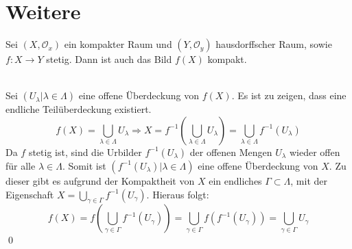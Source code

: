 \section{Weitere}
% 
\begin{Satz}\label{satz:ftk:kompakt}
	Sei \( (X, \mathcal{O}_x) \) ein kompakter Raum und \((Y, \mathcal{O}_y)\) hausdorffscher Raum, sowie \\
	\(f: X \to Y\) stetig.
	Dann ist auch das Bild \( f(X) \) kompakt.
\end{Satz}
%
	\\
	Sei \( (U_{\lambda} | \lambda \in \Lambda) \) eine offene Überdeckung von \(f(X)\). Es ist zu zeigen,
	dass eine endliche Teilüberdeckung existiert. 
	\[ f(X) = \bigcup_{\lambda \in \Lambda} U_{\lambda} \Rightarrow X = 
  	 f^{-1}(\bigcup_{\lambda \in \Lambda} U_{\lambda}) = 
		 \bigcup_{\lambda \in \Lambda} f^{-1}(U_{\lambda}) \]
	Da \(f\) stetig ist, sind die Urbilder \( f^{-1}(U_{\lambda}) \) der offenen Mengen \(U_{\lambda}\) wieder offen für 
	alle \(\lambda \in \Lambda\). Somit ist \( ( f^{-1}(U_{\lambda}) | \lambda \in \Lambda ) \) eine offene Überdeckung
	von \(X\). Zu dieser gibt es aufgrund der Kompaktheit von \(X\) ein endliches \( \Gamma \subset \Lambda \), mit 
	der Eigenschaft \( X = \bigcup_{\gamma \in \Gamma} f^{-1}(U_{\gamma}) \). Hieraus folgt:
	\[ f(X) = f(\bigcup_{\gamma \in \Gamma} f^{-1}(U_{\gamma})) = 
  	 \bigcup_{\gamma \in \Gamma} f(f^{-1}(U_{\gamma})) = 
	   \bigcup_{\gamma \in \Gamma} U_{\gamma} \]
\qed

